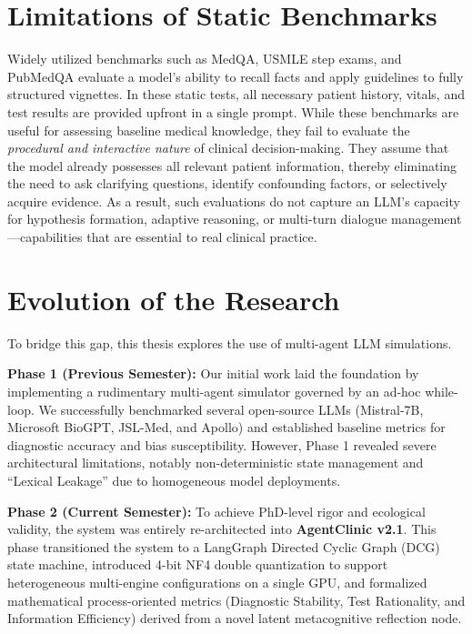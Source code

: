 \documentclass[12pt, a4paper, twoside]{report}
\begin{document}
\section{Limitations of Static Benchmarks}
Widely utilized benchmarks such as MedQA, USMLE step exams, and PubMedQA evaluate a model’s ability to recall facts and apply guidelines to fully structured vignettes. In these static tests, all necessary patient history, vitals, and test results are provided upfront in a single prompt. While these benchmarks are useful for assessing baseline medical knowledge, they fail to evaluate the \textit{procedural and interactive nature} of clinical decision-making. They assume that the model already possesses all relevant patient information, thereby eliminating the need to ask clarifying questions, identify confounding factors, or selectively acquire evidence. As a result, such evaluations do not capture an LLM’s capacity for hypothesis formation, adaptive reasoning, or multi-turn dialogue management—capabilities that are essential to real clinical practice.

\section{Evolution of the Research}
To bridge this gap, this thesis explores the use of multi-agent LLM simulations. 

\textbf{Phase 1 (Previous Semester):} Our initial work laid the foundation by implementing a rudimentary multi-agent simulator governed by an ad-hoc while-loop. We successfully benchmarked several open-source LLMs (Mistral-7B, Microsoft BioGPT, JSL-Med, and Apollo) and established baseline metrics for diagnostic accuracy and bias susceptibility. However, Phase 1 revealed severe architectural limitations, notably non-deterministic state management and ``Lexical Leakage'' due to homogeneous model deployments.

\textbf{Phase 2 (Current Semester):} To achieve PhD-level rigor and ecological validity, the system was entirely re-architected into \textbf{AgentClinic v2.1}. This phase transitioned the system to a LangGraph Directed Cyclic Graph (DCG) state machine, introduced 4-bit NF4 double quantization to support heterogeneous multi-engine configurations on a single GPU, and formalized mathematical process-oriented metrics (Diagnostic Stability, Test Rationality, and Information Efficiency) derived from a novel latent metacognitive reflection node.
\end{document}
